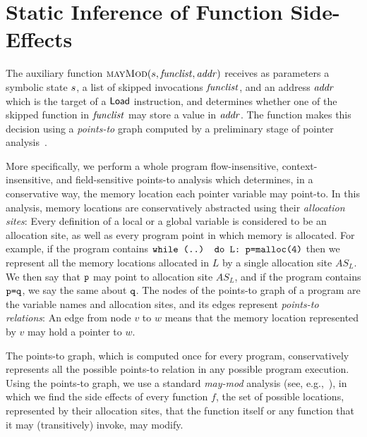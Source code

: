 
\section{Static Inference of Function Side-Effects}
\label{Se:MayMod}
\label{Se:IdentifyingLoads}

The auxiliary function $\Call{mayMod}{ \workstate, \funclist, \addr }$
receives as parameters a symbolic state $s$, a list of
skipped invocations $\mathit{funclist}$, and an address $\mathit{addr}$ which is the
target of a $\mathsf{Load}$ instruction, and determines whether one
of the skipped function in $\mathit{funclist}$ may store a value in $\mathit{addr}$.
The function makes this decision using a \emph{points-to} graph
computed by a preliminary stage of pointer
analysis~\cite{Hind:Paste2001, Smaragdakis:FTPL2015}.

More specifically, we perform a whole program flow-insensitive,
context-insensitive, and field-sensitive points-to analysis which
determines, in a conservative way, the memory location each pointer
variable may point-to. In this analysis, memory locations are
conservatively abstracted using their \emph{allocation sites}: Every
definition of a local or a global variable is considered to be an
allocation site, as well as every program point in which memory is
allocated. For example, if the program contains
$\texttt{while (..) do L: p=malloc(4)}$ then we represent all the memory
locations allocated in $L$ by a single allocation site
$\mathit{AS}_L$.  We then say that $\texttt{p}$ may point to allocation
site $\mathit{AS}_L$, and if the program contains $\texttt{p=q}$, we say
the same about $\texttt{q}$. The nodes of the points-to graph of a
program are the variable names and allocation sites, and its edges
represent \emph{points-to relations}: An edge from node $v$ to $w$
means that the memory location represented by $v$ may hold a pointer
to $w$.

The points-to graph, which is computed once for every program,
conservatively represents all the possible points-to relation in any
possible program execution. Using the points-to graph, we use a
standard \emph{may-mod} analysis (see, e.g.,~\cite{dragon-book}), in
which we find the side effects of every function $f$, \ie the set of
possible locations, represented by their allocation sites, that the
function itself or any function that it may (transitively) invoke, may
modify.

